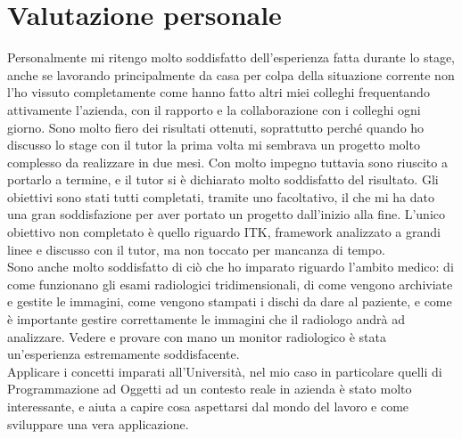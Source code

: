 \section{Valutazione personale}
Personalmente mi ritengo molto soddisfatto dell'esperienza fatta durante lo stage, anche se lavorando principalmente da casa per colpa della situazione corrente non l'ho vissuto completamente come hanno fatto altri miei colleghi frequentando attivamente l'azienda, con il rapporto e la collaborazione con i colleghi ogni giorno. Sono molto fiero dei risultati ottenuti, soprattutto perché quando ho discusso lo stage con il tutor la prima volta mi sembrava un progetto molto complesso da realizzare in due mesi. Con molto impegno tuttavia sono riuscito a portarlo a termine, e il tutor si è dichiarato molto soddisfatto del risultato. Gli obiettivi sono stati tutti completati, tramite uno facoltativo, il che mi ha dato una gran soddisfazione per aver portato un progetto dall'inizio alla fine. L'unico obiettivo non completato è quello riguardo ITK, framework analizzato a grandi linee e discusso con il tutor, ma non toccato per mancanza di tempo.
\\
Sono anche molto soddisfatto di ciò che ho imparato riguardo l'ambito medico: di come funzionano gli esami radiologici tridimensionali, di come vengono archiviate e gestite le immagini, come vengono stampati i dischi da dare al paziente, e come è importante gestire correttamente le immagini che il radiologo andrà ad analizzare. Vedere e provare con mano un monitor radiologico è stata un'esperienza estremamente soddisfacente.
\\
Applicare i concetti imparati all'Università, nel mio caso in particolare quelli di Programmazione ad Oggetti ad un contesto reale in azienda è stato molto interessante, e aiuta a capire cosa aspettarsi dal mondo del lavoro e come sviluppare una vera applicazione.
